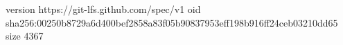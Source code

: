 version https://git-lfs.github.com/spec/v1
oid sha256:00250b8729a6d400bef2858a83f05b90837953eff198b916ff24ceb03210dd65
size 4367
